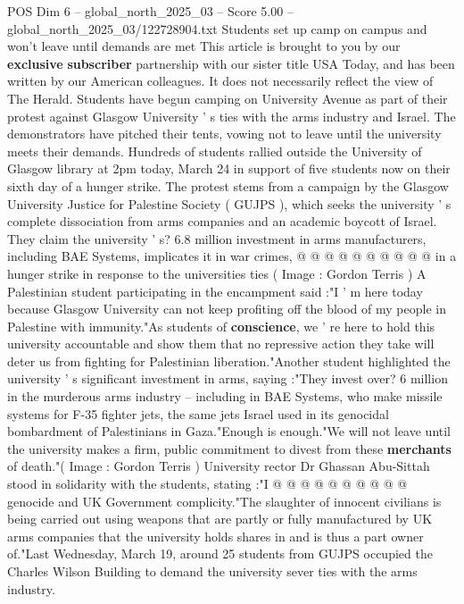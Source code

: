 \begin{textsample}{POS Dim 6 – global\_north\_2025\_03 – Score 5.00 – global\_north\_2025\_03/122728904.txt}  \label{ex:f6_pos_228}
Students set up camp on campus and won't leave until demands are met This article is brought to you by our \textbf{exclusive} \textbf{subscriber} partnership with our sister title USA Today, and has been written by our American colleagues.
It does not necessarily reflect the view of The Herald.
Students have begun camping on University Avenue as part of their protest against Glasgow University ' s ties with the arms industry and Israel.
The demonstrators have pitched their tents, vowing not to leave until the university meets their demands.
Hundreds of students rallied outside the University of Glasgow library at 2pm today, March 24 in support of five students now on their sixth day of a hunger strike.
The protest stems from a campaign by the Glasgow University Justice for Palestine Society ( GUJPS ), which seeks the university ' s complete dissociation from arms companies and an academic boycott of Israel.
They claim the university ' s? 6.8 million investment in arms manufacturers, including BAE Systems, implicates it in war crimes, @ @ @ @ @ @ @ @ @ @ in a hunger strike in response to the universities ties ( Image : Gordon Terris ) A Palestinian student participating in the encampment said :"I ' m here today because Glasgow University can not keep profiting off the blood of my people in Palestine with immunity."As students of \textbf{conscience}, we ' re here to hold this university accountable and show them that no repressive action they take will deter us from fighting for Palestinian liberation."Another student highlighted the university ' s significant investment in arms, saying :"They invest over? 6 million in the murderous arms industry -- including in BAE Systems, who make missile systems for F-35 fighter jets, the same jets Israel used in its genocidal bombardment of Palestinians in Gaza."Enough is enough."We will not leave until the university makes a firm, public commitment to divest from these \textbf{merchants} of death."( Image : Gordon Terris ) University rector Dr Ghassan Abu-Sittah stood in solidarity with the students, stating :"I @ @ @ @ @ @ @ @ @ @ genocide and UK Government complicity."The slaughter of innocent civilians is being carried out using weapons that are partly or fully manufactured by UK arms companies that the university holds shares in and is thus a part owner of."Last Wednesday, March 19, around 25 students from GUJPS occupied the Charles Wilson Building to demand the university sever ties with the arms industry.

\end{textsample}
